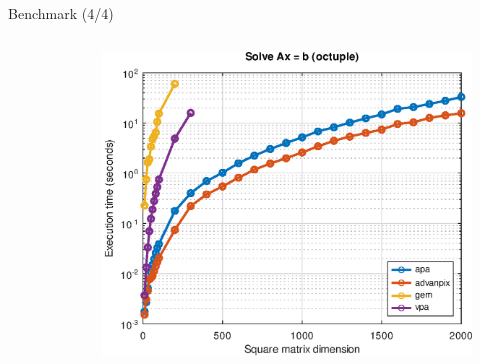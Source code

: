\begin{frame}{Benchmark (4/4)}
\begin{columns}
\begin{column}{0.3\textwidth}
\begin{figure}
\end{figure}
\end{column}
\begin{column}{0.3\textwidth}
\begin{figure}
\centering
\includegraphics[width=1.0\linewidth]{res/data/2021-11-24_run-01-lin-octuple-semilogy}
\end{figure}
\end{column}
\end{columns}

\end{frame}